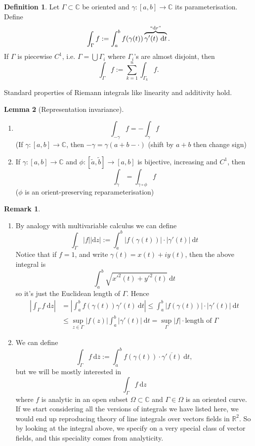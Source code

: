 \documentclass[a4paper]{article}
\theoremstyle{definition}
\newtheorem{defn}{Definition}[subsection]
\newtheorem{lemma}[defn]{Lemma}
\newtheorem*{remark}{Remark}
\begin{document}
\begin{defn}
Let $\Gamma \subset \mathbb C$ be oriented and $\gamma:[a,b]\rightarrow \mathbb C$ its parameterisation. Define
\[
\int_\Gamma f := \int_a^b f(\gamma(t)) \overbrace{\gamma'(t) \ \mathrm d t}^{``\mathrm d r\text{''}} .
\]
If $\Gamma$ is piecewise $C^1$, i.e. $\Gamma = \bigcup \Gamma_i$ where $\Gamma_i$'s are almost disjoint, then
\[
\int_\Gamma f := \sum_{k=1}^n \int_{\Gamma_k} f .
\]
\end{defn}
Standard properties of Riemann integrals like linearity and additivity hold.

\begin{lemma}[Representation invariance]
\begin{enumerate}
    \item \[
    \int_{-\gamma} f = -\int_\gamma f
    \]
    (If $\gamma:[a,b]\rightarrow \mathbb C$, then $-\gamma=\gamma (a+b-\cdot )$ (shift by $a+b$ then change sign)
    \item If $\gamma:[a,b]\rightarrow \mathbb C$ and $\phi:[\tilde{a},\tilde{b}]\rightarrow[a,b]$ is bijective, increasing and $C^1$, then
    \[
    \int_\gamma = \int_{\gamma \circ \phi} f
    \]
    ($\phi$ is an orient-preserving reparameterisation)
\end{enumerate}
\end{lemma}
\begin{remark}
\begin{enumerate}
\item By analogy with multivariable calculus we can define
\[
\int_\Gamma |f| |\mathrm d z| := \int_a^b |f(\gamma(t))| \cdot |\gamma'(t)| \ \mathrm d t
\]
Notice that if $f=1$, and write $\gamma(t)=x(t)+i y(t)$, then the above integral is
\[
\int_a^b \sqrt{x'^2(t)+y'^2(t)} \ \mathrm d t
\]
so it's just the Euclidean length of $\Gamma$. Hence
\[
\begin{aligned}
\left| \int_\Gamma f \ \mathrm d z \right| &= \left| \int_a^b f(\gamma(t)) \gamma'(t) \ \mathrm d t \right| \leq \int_a^b |f(\gamma(t))| \cdot |\gamma'(t)| \ \mathrm d t \\&\leq \underset{z\in \Gamma}{\sup} |f(z)| \int_a^b |\gamma'(t)| \ \mathrm d t = \underset{\Gamma}{\sup}|f| \cdot \text{length of } \Gamma 
\end{aligned}
\]
\item We can define
\[
\int_\Gamma f \ \mathrm d \overline{z} := \int_a^b f(\gamma(t)) \cdot \overline{\gamma '(t)} \ \mathrm d t ,
\]
but we will be mostly interested in
\[
\int_\Gamma f \ \mathrm d z
\]
where $f$ is analytic in an open subset $\Omega \subset \mathbb C$ and $\Gamma \in \Omega$ is an oriented curve. If we start considering all the versions of integrals we have listed here, we would end up reproducing theory of line integrals over vectors fields in $\mathbb R^2$. So by looking at the integral above, we specify on a very special class of vector fields, and this speciality comes from analyticity.
\end{enumerate}
\end{remark}
\end{document}
